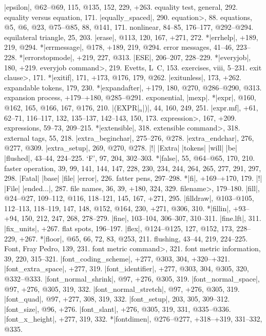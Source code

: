 |epsilon|, @62--@69, 115, @135, 152, 229, +263.
equality test, general, 292.
equality versus equation, 171.
|equally_spaced|, 290.
\<equation>, 88.
equations, @5, @6, @23, @75--@85, 88, @141, 171.
\sub nonlinear, 84--85, 176--177, @292--@294.
equilateral triangle, 25, 203.
|erase|, @113, 120, 167, +271, 272.
*|errhelp|, +189, 219, @294.
*|errmessage|, @178, +189, 219, @294.
error messages, 41--46, 223--228.
*|errorstopmode|, +219, 227, @313.
|ESE|, 206--207, 228--229.
*|everyjob|, 180, +219.
\<everyjob command>, 219.
Evetts, L\period\ C\period, 153.
exercises, viii, 5--231.
\<exit clause>, 171.
*|exitif|, 171, +173, @176, 179, @262.
|exitunless|, 173, +262.
expandable tokens, 179, 230.
*|expandafter|, +179, 180, @270, @286--@290, @313.
expansion process, +179--+180, @285--@291.
exponential, \see |mexp|.
*|expr|, @160, @162, 165, @166, 167, @176, 210.
|(EXPR|$_n$|)|, 44, 160, 249, 251.
|expr.mf|, +61, 62--71, 116--117, 132, 135--137, 142--143, 150, 173.
\<expression>, 167, +209.
expressions, 59--73, 209--215.
*|extensible|, 318.
\<extensible command>, 318.
external tags, 55, 218.
|extra_beginchar|, 275--276, @278.
|extra_endchar|, 276, @277, @309.
|extra_setup|, 269, @270, @278.
|!| |Extra| |tokens| |will| |be| |flushed|, 43--44, 224--225.
\newletter
`F', 97, 204, 302--303.
*|false|, 55, @64--@65, 170, 210.
faster operation, 39, 99, 141, 144, 147, 228, 230, 234, 244, 264, 265, 277,
 291, 297, 298.
|Fatal| |base| |file| |error|, 226.
fatter pens, 297--298.
*|fi|, +169--+170, 179.
|!| |File| |ended...|, 287.
file names, 36, 39, +180, 324, 329.
\<filename>, 179--180.
|fill|, @24--@27, 109--112, @116, 118--121, 145, 167, +271, 295.
|filldraw|, @103--@105, 112--113, 118--119, 147, 148, @152, @164,
 230, +271, @306, 310.
*|fillin|, +93--+94, 150, 212, 247, 268, 278--279.
|fine|, 103--104, 306--307, 310--311.
|fine.lft|, 311.
|fix_units|, +267.
flat spots, 196--197.
|flex|, @124--@125, 127, @152, 173, 228--229, +267.
*|floor|, @65, 66, 72, 83, @253, 211.
flushing, 43--44, 219, 224--225.
Font, Fray Pedro, 139, 231.
\<font metric command>, 321.
font metric information, 39, 220, 315--321.
|font_coding_scheme|, +277, @303, 304, +320--+321.
|font_extra_space|, +277, 319.
|font_identifier|, +277, @303, 304, @305, 320, @332--@333.
|font_normal_shrink|, @97, +276, @305, 319.
|font_normal_space|, @97, +276, @305, 319, 332.
|font_normal_stretch|, @97, +276, @305, 319.
|font_quad|, @97, +277, 308, 319, 332.
|font_setup|, 203, 305, 309--312.
|font_size|, @96, +276.
|font_slant|, +276, @305, 319, 331, @335--@336.
|font_x_height|, +277, 319, 332.
*|fontdimen|, @276--@277, +318--+319, 331--332, @335.
